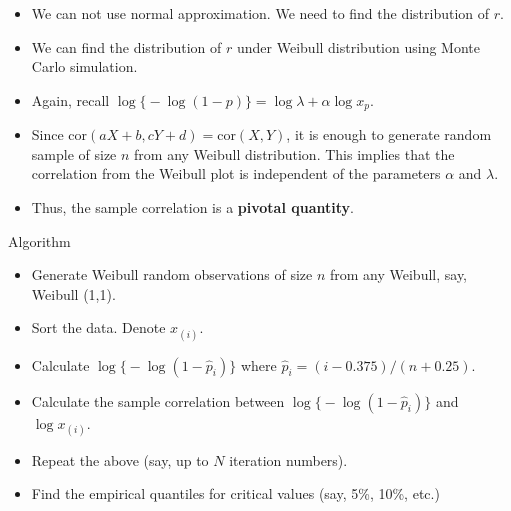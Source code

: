 \begin{frame}   %
\begin{itemize}
\item We can not use normal approximation. We need to find the distribution of $r$.
\item We can find the distribution of $r$ under Weibull distribution using Monte Carlo simulation. \\
\item Again, recall $\log\big\{ -\log(1-p) \big\} = \log\lambda + \alpha \log x_p.$ \\
\item Since $\mathrm{cor}(aX+b,cY+d) = \mathrm{cor}(X,Y)$, it is enough to generate random sample
of size $n$ from any Weibull distribution.
 This implies that the correlation 
from the Weibull plot is independent of the parameters $\alpha$ and $\lambda$.
\item Thus, the sample correlation is a \textbf{pivotal quantity}.
\end{itemize}
\end{frame}
\begin{frame}  
\begin{block}{Algorithm}
\begin{itemize}
\item Generate Weibull random observations of size $n$ from any Weibull, say, Weibull (1,1).
\item Sort the data. Denote $x_{(i)}$.
\item Calculate $\log\big\{ -\log(1-\hat{p}_i) \big\}$ where $\hat{p}_i= (i-0.375)/(n+0.25)$.
\item Calculate the sample correlation between $\log\big\{ -\log(1-\hat{p}_i) \big\}$ and $\log x_{(i)}$.
\item Repeat the above (say, up to $N$ iteration numbers).
\item Find the empirical quantiles for critical values (say, 5\%, 10\%, etc.)
\end{itemize}
\end{block}\end{frame}





